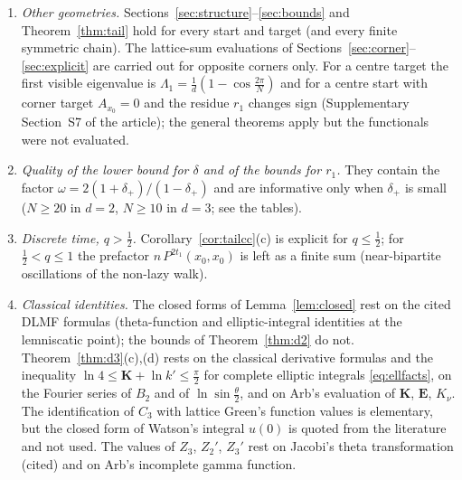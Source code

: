 \documentclass[11pt,a4paper]{article}
\theoremstyle{plain}
\theoremstyle{definition}
\numberwithin{equation}{section}
\begin{document}
\begin{enumerate}
\item[(G5)] \emph{Other geometries.} Sections~\ref{sec:structure}--\ref{sec:bounds} and Theorem~\ref{thm:tail} hold for every start and target (and every finite symmetric chain). The lattice-sum evaluations of Sections~\ref{sec:corner}--\ref{sec:explicit} are carried out for opposite corners only. For a centre target the first visible eigenvalue is $\Lambda_1=\frac1d(1-\cos\frac{2\pi}N)$ and for a centre start with corner target $A_{x_0}=0$ and the residue $r_1$ changes sign (Supplementary Section~S7 of the article); the general theorems apply but the functionals were not evaluated.
\item[(G6)] \emph{Quality of the lower bound for $\delta$ and of the bounds for $r_1$.} They contain the factor $\omega=2(1+\delta_+)/(1-\delta_+)$ and are informative only when $\delta_+$ is small ($N\ge20$ in $d=2$, $N\ge10$ in $d=3$; see the tables).
\item[(G7)] \emph{Discrete time, $q>\frac12$.} Corollary~\ref{cor:tailcc}(c) is explicit for $q\le\frac12$; for $\frac12<q\le1$ the prefactor $n\,P^{2t_1}(x_0,x_0)$ is left as a finite sum (near-bipartite oscillations of the non-lazy walk).
\item[(G8)] \emph{Classical identities.} The closed forms of Lemma~\ref{lem:closed} rest on the cited DLMF formulas (theta-function and elliptic-integral identities at the lemniscatic point); the bounds of Theorem~\ref{thm:d2} do not. Theorem~\ref{thm:d3}(c),(d) rests on the classical derivative formulas and the inequality $\ln4\le\mathbf K+\ln k'\le\frac\pi2$ for complete elliptic integrals \eqref{eq:ellfacts}, on the Fourier series of $B_2$ and of $\ln\sin\frac\theta2$, and on Arb's evaluation of $\mathbf K$, $\mathbf E$, $K_\nu$. The identification of $C_3$ with lattice Green's function values is elementary, but the closed form of Watson's integral $u(0)$ is quoted from the literature and not used. The values of $Z_3$, $Z_2'$, $Z_3'$ rest on Jacobi's theta transformation (cited) and on Arb's incomplete gamma function.
\end{enumerate}
\end{document}
